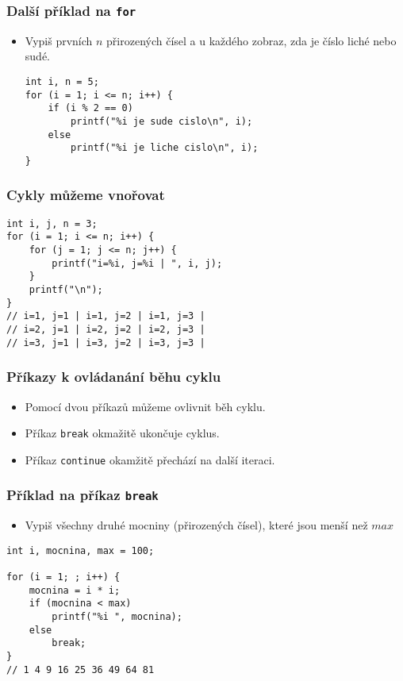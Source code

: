 \documentclass{beamer}
\newenvironment{itemizex}%
  {\large \begin{itemize}%
    \setlength{\itemsep}{8pt}%
    \setlength{\parskip}{8pt}}%
  {\end{itemize}}
\begin{document}
\begin{frame}[t,fragile]\frametitle{Další příklad na \texttt{for}} 
\begin{itemizex}
  \item Vypiš prvních $n$ přirozených čísel a u každého zobraz, zda je číslo liché nebo sudé.
\begin{verbatim} 
int i, n = 5;
for (i = 1; i <= n; i++) {
    if (i % 2 == 0)
        printf("%i je sude cislo\n", i);
    else
        printf("%i je liche cislo\n", i);
}
\end{verbatim}
\end{itemizex}
\end{frame}


\begin{frame}[t,fragile]\frametitle{Cykly můžeme vnořovat} 
\begin{verbatim} 
int i, j, n = 3;
for (i = 1; i <= n; i++) {
    for (j = 1; j <= n; j++) {
        printf("i=%i, j=%i | ", i, j);
    }
    printf("\n");
}
// i=1, j=1 | i=1, j=2 | i=1, j=3 | 
// i=2, j=1 | i=2, j=2 | i=2, j=3 | 
// i=3, j=1 | i=3, j=2 | i=3, j=3 |
\end{verbatim}
\end{frame}


\begin{frame}[t,fragile]\frametitle{Příkazy k ovládanání běhu cyklu} 
  \begin{itemizex}
    \item Pomocí dvou příkazů můžeme ovlivnit běh cyklu.
    \item Příkaz \texttt{break} okmažitě ukončuje cyklus.
    \item Příkaz \texttt{continue} okamžitě přechází na další iteraci.
  \end{itemizex}
\end{frame}



\begin{frame}[t,fragile]\frametitle{Příklad na příkaz \texttt{break}} 
\begin{itemizex}
  \item Vypiš všechny druhé mocniny (přirozených čísel), které jsou menší než $max$ 
\end{itemizex}
\begin{verbatim} 
int i, mocnina, max = 100;

for (i = 1; ; i++) {
    mocnina = i * i;
    if (mocnina < max) 
        printf("%i ", mocnina);
    else
        break;
}
// 1 4 9 16 25 36 49 64 81
\end{verbatim}
\end{frame}
\end{document}
